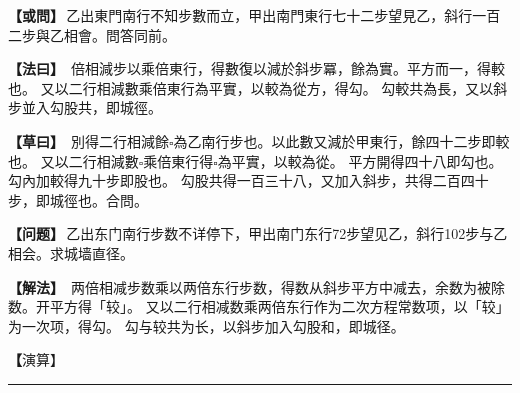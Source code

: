 \documentclass[11pt,a4paper]{article}
\let\origsquare\square
\renewcommand{\square}{\ensuremath{\origsquare}}%
\newcommand{\longline}{\noindent\rule{\textwidth}{0.4pt}}
\newcommand{\clOWEN}[1]{%
  \par\vspace{0.3em}%
  \noindent\textcolor{problemcolor}{\textbf{【或問】}}\,{\tradfont #1}\par\nopagebreak%
}
\newcommand{\mdOWEN}[1]{%
  \par\vspace{0.3em}%
  \noindent\textcolor{problemcolor}{\textbf{【问题】}}\,{\modfont #1}\par\nopagebreak%
}
\newcommand{\clFAYUE}[1]{%
  \par\noindent\textcolor{methodcolor}{\textbf{【法曰】}}\,{\tradfont #1}\par\nopagebreak%
}
\newcommand{\mdFAYUE}[1]{%
  \par\noindent\textcolor{methodcolor}{\textbf{【解法】}}\,{\modfont #1}\par\nopagebreak%
}
\newcommand{\clTSAOYUE}[1]{%
  \par\noindent\textcolor{workcolor}{\textbf{【草曰】}}\,{\tradfont #1}\par%
}
\newcommand{\mdTSAOYUE}[1]{%
  \par\noindent\textcolor{workcolor}{\textbf【演算】}}\,{\modfont #1}\par%
\begin{document}
\begin{paracol}{2}

\begin{leftcolumn}
\clOWEN{乙出東門南行不知步數而立，甲出南門東行七十二步望見乙，斜行一百二步與乙相會。問答同前。}

\clFAYUE{%
倍相減步以乘倍東行，得數復以減於斜步冪，餘為實。平方而一，得較也。
又以二行相減數乘倍東行為平實，以較為從方，得勾。
勾較共為長，又以斜步並入勾股共，即城徑。}

\clTSAOYUE{%
別得二行相減餘$\square$為乙南行步也。以此數又減於甲東行，餘四十二步即較也。
又以二行相減數$\square$乘倍東行得$\square$為平實，以較為從。
平方開得四十八即勾也。勾內加較得九十步即股也。
勾股共得一百三十八，又加入斜步，共得二百四十步，即城徑也。合問。}
\end{leftcolumn}

\switchcolumn

\begin{rightcolumn}
\mdOWEN{乙出东门南行步数不详停下，甲出南门东行72步望见乙，斜行102步与乙相会。求城墙直径。}

\mdFAYUE{%
两倍相减步数乘以两倍东行步数，得数从斜步平方中减去，余数为被除数。开平方得「较」。
又以二行相减数乘两倍东行作为二次方程常数项，以「较」为一次项，得勾。
勾与较共为长，以斜步加入勾股和，即城径。}

\mdTSAOYUE{%
辨识得：二行相减余$\square$为乙南行步。以此数再从甲东行中减去，余42步即「较」。
又以二行相减数$\square$乘两倍东行得$\square$为常数项，以「较」为一次项。
开平方得48即勾。勾加较得90步即股。
勾股共得138，加上斜步共得240步，即城径。符合所问。}
\end{rightcolumn}

\end{paracol}

\vspace{0.3cm}
\begin{center}\longline\end{center}
\end{document}

